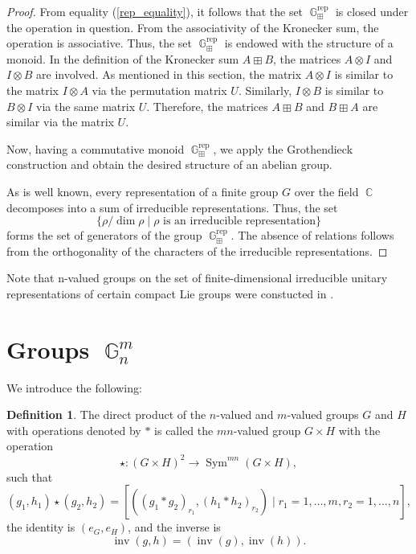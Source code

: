 \documentclass[14pt, dvipsnames]{extarticle}
\theoremstyle{definition}
\theoremstyle{definition}
\newtheorem{defi}{Definition}
\theoremstyle{remark}
\DeclareMathOperator{\G}{\mathbb{G}}
\DeclareMathOperator{\Sym}{\mathrm{Sym}}
\DeclareMathOperator{\inv}{\mathrm{inv}}
\DeclareMathOperator{\Cc}{\mathbb{C}}
\DeclareMathOperator{\rep}{\mathrm{rep}}
\begin{document}
\begin{proof}
From equality (\ref{rep_equality}), it follows that the set $\G^{\rep}_{\boxplus}$ is closed under the operation in question. From the associativity of the Kronecker sum, the operation is associative. Thus, the set $\G^{\rep}_{\boxplus}$ is endowed with the structure of a monoid. In the definition of the Kronecker sum $A \boxplus B$, the matrices $A \otimes I$ and $I \otimes B$ are involved. As mentioned in this section, the matrix $A \otimes I$ is similar to the matrix $I \otimes A$ via the permutation matrix $U$. Similarly, $I \otimes B$ is similar to $B \otimes I$ via the same matrix $U$. Therefore, the matrices $A \boxplus B$ and $B \boxplus A$ are similar via the matrix $U$.

Now, having a commutative monoid $\G^{\rep}_{\boxplus}$, we apply the Grothendieck construction and obtain the desired structure of an abelian group.

As is well known, every representation of a finite group $G$ over the field $\Cc$ decomposes into a sum of irreducible representations. Thus, the set $$\{\rho / \dim \rho \mid \rho \text{ is an irreducible representation}\}$$ forms the set of generators of the group $\G^{\rep}_{\boxplus}$. The absence of relations follows from the orthogonality of the characters of the irreducible representations.
\end{proof}

Note that n-valued groups on the set of finite-dimensional irreducible unitary representations of certain compact Lie groups were constucted in \cite{Buchstaber}.








\section{Groups $\G^m_n$}\label{G^m_n}

We introduce the following:

\begin{defi}\label{cartesian}
The direct product of the $n$-valued and $m$-valued groups $G$ and $H$ with operations denoted by $\ast$ is called the $mn$-valued group $G \times H$ with the operation $$\star: (G \times H)^2 \to \Sym^{mn}(G \times H),$$ such that
$$ (g_1, h_1) \star (g_2, h_2) = [\left( (g_1 \ast g_2)_{r_1}, (h_1 \ast h_2)_{r_2} \right) \mid r_1 = 1, \dots, m, r_2 = 1, \dots, n], $$
the identity is $(e_G, e_H)$, and the inverse is
$$ \inv(g, h) = (\inv(g), \inv(h)). $$
\end{defi}
\end{document}

